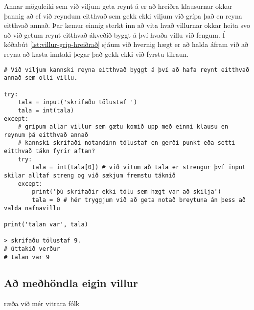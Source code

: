 Annar möguleiki sem við viljum geta reynt á er að hreiðra klausurnar okkar þannig að ef við reyndum eitthvað sem gekk ekki viljum við grípa það en reyna eitthvað annað.
Þar kemur einnig sterkt inn að vita hvað villurnar okkar heita svo að við getum reynt eitthvað ákveðið byggt á því hvaða villu við fengum.
Í kóðabút \ref{lst:villur-grip-hreiðrað} sjáum við hvernig hægt er að halda áfram við að reyna að kasta inntaki þegar það gekk ekki við fyrstu tilraun.

\begin{lstlisting}[caption=Hvernig á má hreiðra try - except - else, label=lst:villur-grip-hreiðrað]
# Við viljum kannski reyna eitthvað byggt á því að hafa reynt eitthvað annað sem olli villu.

try:
	tala = input('skrifaðu tölustaf ')
	tala = int(tala)
except:
	# grípum allar villur sem gætu komið upp með einni klausu en reynum þá eitthvað annað
	# kannski skrifaði notandinn tölustaf en gerði punkt eða setti eitthvað tákn fyrir aftan?
	try:
		tala = int(tala[0]) # við vitum að tala er strengur því input skilar alltaf streng og við sækjum fremstu táknið
	except:
		print('þú skrifaðir ekki tölu sem hægt var að skilja')
		tala = 0 # hér tryggjum við að geta notað breytuna án þess að valda nafnavillu 

print('talan var', tala)

> skrifaðu tölustaf 9.
# úttakið verður 
# talan var 9
\end{lstlisting}

\subsection{Að meðhöndla eigin villur}\label{uk:villur-raise}
ræða við mér vitrara fólk 
